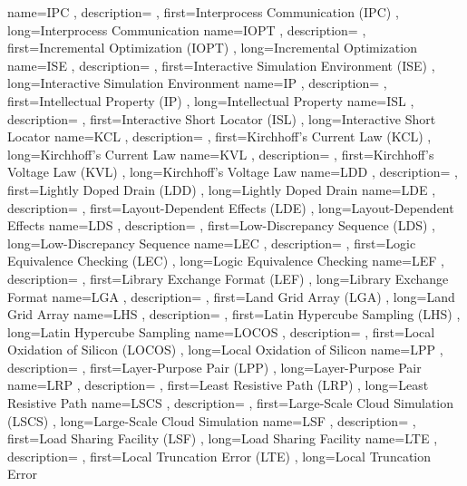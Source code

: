 { name={IPC}
, description={}
, first={Interprocess Communication (IPC)}
, long={Interprocess Communication}
}
{ name={IOPT}
, description={}
, first={Incremental Optimization (IOPT)}
, long={Incremental Optimization}
}
{ name={ISE}
, description={}
, first={Interactive Simulation Environment (ISE)}
, long={Interactive Simulation Environment}
}
{ name={IP}
, description={}
, first={Intellectual Property (IP)}
, long={Intellectual Property}
}
{ name={ISL}
, description={}
, first={Interactive Short Locator (ISL)}
, long={Interactive Short Locator}
}
{ name={KCL}
, description={}
, first={Kirchhoff’s Current Law (KCL)}
, long={Kirchhoff’s Current Law}
}
{ name={KVL}
, description={}
, first={Kirchhoff’s Voltage Law (KVL)}
, long={Kirchhoff’s Voltage Law}
}
{ name={LDD}
, description={}
, first={Lightly Doped Drain (LDD)}
, long={Lightly Doped Drain}
}
{ name={LDE}
, description={}
, first={Layout-Dependent Effects (LDE)}
, long={Layout-Dependent Effects}
}
{ name={LDS}
, description={}
, first={Low-Discrepancy Sequence (LDS)}
, long={Low-Discrepancy Sequence}
}
{ name={LEC}
, description={}
, first={Logic Equivalence Checking (LEC)}
, long={Logic Equivalence Checking}
}
{ name={LEF}
, description={}
, first={Library Exchange Format (LEF)}
, long={Library Exchange Format}
}
{ name={LGA}
, description={}
, first={Land Grid Array (LGA)}
, long={Land Grid Array}
}
{ name={LHS}
, description={}
, first={Latin Hypercube Sampling (LHS)}
, long={Latin Hypercube Sampling}
}
{ name={LOCOS}
, description={}
, first={Local Oxidation of Silicon (LOCOS)}
, long={Local Oxidation of Silicon}
}
{ name={LPP}
, description={}
, first={Layer-Purpose Pair (LPP)}
, long={Layer-Purpose Pair}
}
{ name={LRP}
, description={}
, first={Least Resistive Path (LRP)}
, long={Least Resistive Path}
}
{ name={LSCS}
, description={}
, first={Large-Scale Cloud Simulation (LSCS)}
, long={Large-Scale Cloud Simulation}
}
{ name={LSF}
, description={}
, first={Load Sharing Facility (LSF)}
, long={Load Sharing Facility}
}
{ name={LTE}
, description={}
, first={Local Truncation Error (LTE)}
, long={Local Truncation Error}
}
